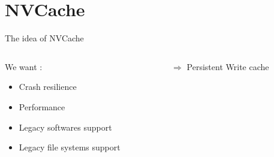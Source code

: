 \documentclass[presentation]{beamer}
\begin{document}
\section{NVCache}
\label{sec:orgae53a31}

\begin{frame}[label={sec:org835d21b}]{The idea of NVCache}
\begin{columns}
\begin{column}{0.5\columnwidth}
\begin{block}{We want :}
\begin{itemize}
\item Crash resilience\pause\\

\item Performance\pause\\

\item Legacy softwares support\pause\\

\item Legacy file systems support\pause\\
\end{itemize}
\end{block}
\end{column}

\begin{column}{0.5\columnwidth}
\begin{block}{\(\Rightarrow\) Persistent Write cache}
\end{block}
\end{column}
\end{columns}
\end{frame}
\end{document}
